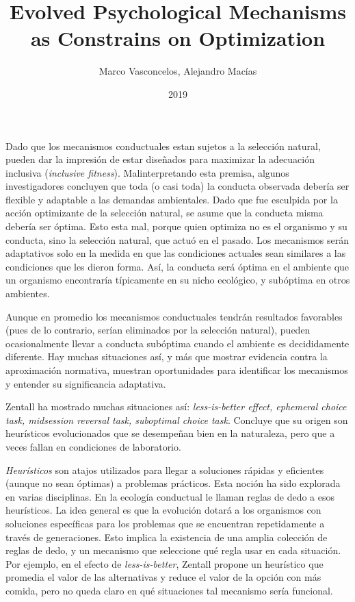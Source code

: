 \documentclass[a4paper,12pt]{article}
\title{Evolved Psychological Mechanisms as Constrains on Optimization}
\author{Marco Vasconcelos, Alejandro Macías}
\date{2019}
\begin{document}
{\scshape\bfseries \maketitle}

Dado que los mecanismos conductuales estan sujetos a la selección natural, pueden dar la impresión de estar diseñados para maximizar la adecuación inclusiva ({\slshape inclusive fitness}). Malinterpretando esta premisa, algunos investigadores concluyen que toda (o casi toda) la conducta observada debería ser flexible y adaptable a las demandas ambientales. Dado que fue esculpida por la acción optimizante de la selección natural, se asume que la conducta misma debería ser óptima. Esto esta mal, porque quien optimiza no es el organismo y su conducta, sino la selección natural, que actuó en el pasado. Los mecanismos serán adaptativos solo en la medida en que las condiciones actuales sean similares a las condiciones que les dieron forma. Así, la conducta será óptima en el ambiente que un organismo encontraría típicamente en su nicho ecológico, y subóptima en otros ambientes.

Aunque en promedio los mecanismos conductuales tendrán resultados favorables (pues de lo contrario, serían eliminados por la selección natural), pueden ocasionalmente llevar a conducta subóptima cuando el ambiente es decididamente diferente. Hay muchas situaciones así, y más que mostrar evidencia contra la aproximación normativa, muestran oportunidades para identificar los mecanismos y entender su significancia adaptativa.

Zentall ha mostrado muchas situaciones así: {\slshape less-is-better effect, ephemeral choice task, midsession reversal task, suboptimal choice task}. Concluye que su origen son heurísticos evolucionados que se desempeñan bien en la naturaleza, pero que a veces fallan en condiciones de laboratorio.

{\slshape Heurísticos} son atajos utilizados para llegar a soluciones rápidas y eficientes (aunque no sean óptimas) a problemas prácticos. Esta noción ha sido explorada en varias disciplinas. En la ecología conductual le llaman reglas de dedo a esos heurísticos. La idea general es que la evolución dotará a los organismos con soluciones específicas para los problemas que se encuentran repetidamente a través de generaciones. Esto implica la existencia de una amplia colección de reglas de dedo, y un mecanismo que seleccione qué regla usar en cada situación. Por ejemplo, en el efecto de {\slshape less-is-better}, Zentall propone un heurístico que promedia el valor de las alternativas y reduce el valor de la opción con más comida, pero no queda claro en qué situaciones tal mecanismo sería funcional.
\end{document}
